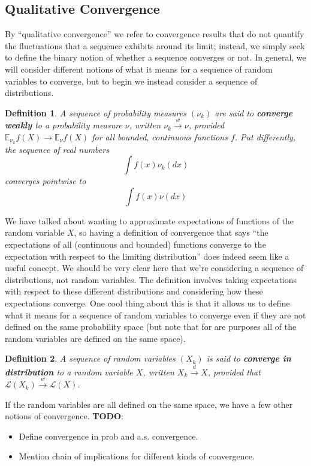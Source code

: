\documentclass[12pt]{article}
\newcommand{\E}{\mathbb{E}}
\newtheorem{definition}{Definition}
\begin{document}
\subsection{Qualitative Convergence}
By ``qualitative convergence'' we refer to convergence results that do not quantify the fluctuations that a sequence exhibits around its limit; instead, we simply
seek to define the binary notion of whether a sequence converges or not. In general, we will consider different notions of what it means for a sequence of random 
variables to converge, but to begin we instead consider a sequence of distributions. 

\begin{definition}
A sequence of probability measures $(\nu_k)$ are said to \textbf{converge weakly} to a probability measure $\nu$, written $\nu_k \overset{w}{\to} \nu$, 
provided $\E_{\nu_k} f(X) \to \E_\nu f(X)$ for all bounded, continuous functions $f$. Put differently, the sequence of real numbers
\[\int f(x) \nu_k(dx) \]
converges pointwise to 
\[\int f(x) \nu(dx)\]
\end{definition}
We have talked about wanting to approximate expectations of functions of the random variable $X$, so having a definition of convergence that says 
``the expectations of all (continuous and bounded) functions converge to the expectation with respect to the limiting distribution'' does indeed seem like 
a useful concept. We should be very clear here that we're considering a sequence of distributions, not random variables. The definition involves taking 
expectations with respect to these different distributions and considering how these expectations converge. One cool thing about this is that it allows us to 
define what it means for a sequence of random variables to converge even if they are not defined on the same probability space (but note that for are purposes 
all of the random variables are defined on the same space). 
\begin{definition}
A sequence of random variables $(X_k)$ is said to \textbf{converge in distribution} to a random variable $X$, written $X_k \overset{d}{\to} X$, provided that 
$\mathcal{L}(X_k) \overset{w}{\to} \mathcal{L}(X)$. 
\end{definition}

If the random variables are all defined on the same space, we have a few other notions of convergence. 
\textbf{TODO}: 
\begin{itemize}
\item Define convergence in prob and a.s. convergence. 
\item Mention chain of implications for different kinds of convergence. 
\end{itemize}
\end{document}
